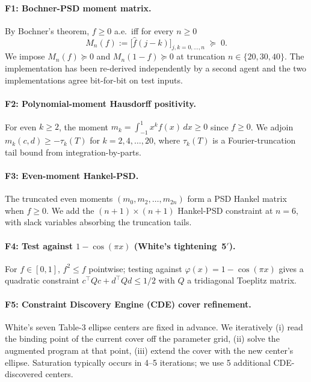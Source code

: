 \documentclass[11pt]{article}
\theoremstyle{plain}
\theoremstyle{definition}
\begin{document}
\paragraph{F1: Bochner-PSD moment matrix.}
By Bochner's theorem, $f \ge 0$ a.e.\ iff for every $n \ge 0$
\[
M_n(f) := \bigl[\hat f(j - k)\bigr]_{j,k = 0,\dots,n} \;\succeq\; 0.
\]
We impose $M_n(f) \succeq 0$ and $M_n(1 - f) \succeq 0$ at truncation
$n \in \{20, 30, 40\}$. The implementation has been re-derived
independently by a second agent and the two implementations agree
bit-for-bit on test inputs.

\paragraph{F2: Polynomial-moment Hausdorff positivity.}
For even $k \ge 2$, the moment $m_k = \int_{-1}^1 x^k f(x)\, dx \ge 0$
since $f \ge 0$. We adjoin $m_k(c, d) \ge -\tau_k(T)$ for
$k = 2, 4, \dots, 20$, where $\tau_k(T)$ is a Fourier-truncation tail
bound from integration-by-parts.

\paragraph{F3: Even-moment Hankel-PSD.}
The truncated even moments $(m_0, m_2, \dots, m_{2n})$ form a PSD
Hankel matrix when $f \ge 0$. We add the $(n+1) \times (n+1)$
Hankel-PSD constraint at $n = 6$, with slack variables absorbing the
truncation tails.

\paragraph{F4: Test against $1 - \cos(\pi x)$ (White's tightening~5$'$).}
For $f \in [0, 1]$, $f^2 \le f$ pointwise; testing against
$\varphi(x) = 1 - \cos(\pi x)$ gives a quadratic constraint
$c^\top Q c + d^\top Q d \le 1/2$ with $Q$ a tridiagonal Toeplitz
matrix.

\paragraph{F5: Constraint Discovery Engine (CDE) cover refinement.}
White's seven Table-3 ellipse centers are fixed in advance. We
iteratively (i) read the binding point of the current cover off the
parameter grid, (ii) solve the augmented program at that point,
(iii) extend the cover with the new center's ellipse. Saturation
typically occurs in 4--5 iterations; we use 5 additional
CDE-discovered centers.
\end{document}
